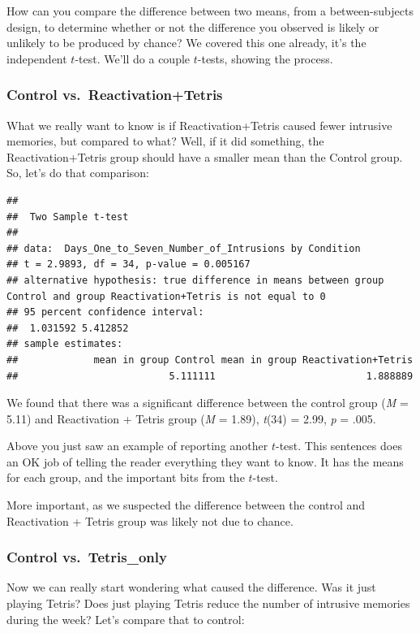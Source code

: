 \documentclass[
]{book}
\begin{document}
How can you compare the difference between two means, from a between-subjects design, to determine whether or not the difference you observed is likely or unlikely to be produced by chance? We covered this one already, it's the independent \(t\)-test. We'll do a couple \(t\)-tests, showing the process.

\subsubsection{Control vs.~Reactivation+Tetris}\label{control-vs.-reactivationtetris}

What we really want to know is if Reactivation+Tetris caused fewer intrusive memories, but compared to what? Well, if it did something, the Reactivation+Tetris group should have a smaller mean than the Control group. So, let's do that comparison:

\begin{verbatim}
## 
##  Two Sample t-test
## 
## data:  Days_One_to_Seven_Number_of_Intrusions by Condition
## t = 2.9893, df = 34, p-value = 0.005167
## alternative hypothesis: true difference in means between group Control and group Reactivation+Tetris is not equal to 0
## 95 percent confidence interval:
##  1.031592 5.412852
## sample estimates:
##             mean in group Control mean in group Reactivation+Tetris 
##                          5.111111                          1.888889
\end{verbatim}

We found that there was a significant difference between the control group (\emph{M} = 5.11) and Reactivation + Tetris group (\emph{M} = 1.89), \emph{t}(34) = 2.99, \emph{p} = .005.

Above you just saw an example of reporting another \(t\)-test. This sentences does an OK job of telling the reader everything they want to know. It has the means for each group, and the important bits from the \(t\)-test.

More important, as we suspected the difference between the control and Reactivation + Tetris group was likely not due to chance.

\subsubsection{Control vs.~Tetris\_only}\label{control-vs.-tetris_only}

Now we can really start wondering what caused the difference. Was it just playing Tetris? Does just playing Tetris reduce the number of intrusive memories during the week? Let's compare that to control:
\end{document}
